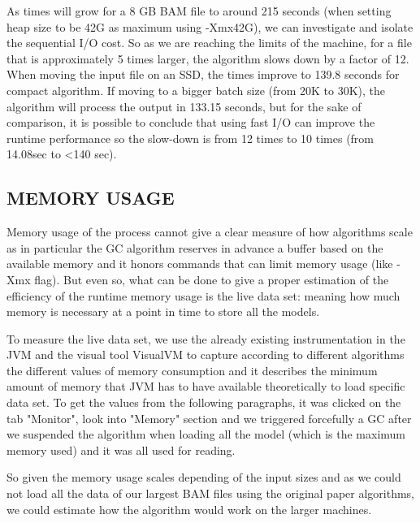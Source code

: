 \documentclass[a4paper,twoside]{article}
\begin{document}
As times will grow for a 8 GB BAM file to around 215 seconds (when setting heap size to be 42G as maximum using -Xmx42G), we can investigate and isolate the sequential I/O cost.
So as we are reaching the limits of the machine, for a file that is approximately 5 times larger, the algorithm slows down by a factor of 12.
When moving the input file on an SSD, the times improve to 139.8 seconds for compact algorithm.
If moving to a bigger batch size (from 20K to 30K), the algorithm will process the output in 133.15 seconds, but for the sake of comparison, it is possible to conclude that using fast I/O can improve the runtime performance so the slow-down is from 12 times to 10 times (from 14.08sec to <140 sec).




\subsection{\uppercase{Memory Usage}}\label{subsec:uppercase8}
Memory usage of the process cannot give a clear measure of how algorithms scale as in particular the GC algorithm reserves in advance a buffer based on the available memory and it honors commands that can limit memory usage (like -Xmx flag).
But even so, what can be done to give a proper estimation of the efficiency of the runtime memory usage is the live data set: meaning how much memory is necessary at a point in time to store all the models.

To measure the live data set, we use the already existing instrumentation in the JVM and the visual tool
VisualVM to capture according to different algorithms the different values of memory consumption and it describes the minimum amount of memory that JVM has to have available theoretically to load specific data set.
To get the values from the following paragraphs, it was clicked on the tab "Monitor", look into "Memory" section and we triggered forcefully a GC after we suspended the algorithm when loading all the model (which is the maximum memory used) and it was all used for reading.

So given the memory usage scales depending of the input sizes and as we could not load all the data of
our largest BAM files using the original paper algorithms, we could estimate how the algorithm would work on the larger machines.
\end{document}
